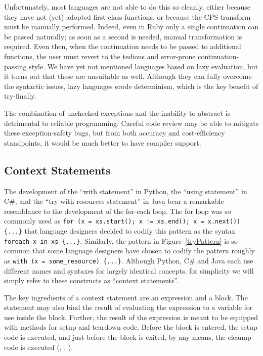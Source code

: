 \documentclass[11pt]{article}
\newcommand{\maybePage}{\newpage}
\begin{document}
Unfortunately, most languages are not able to do this so cleanly, either because they have not (yet) adopted first-class functions, or because the CPS transform must be manually performed.
Indeed, even in Ruby only a single continuation can be passed naturally; as soon as a second is needed, manual transformation is required.
Even then, when the continuation needs to be passed to additional functions, the user must revert to the tedious and error-prone continuation-passing style.
We have yet not mentioned languages based on lazy evaluation, but it turns out that these are unsuitable as well.
Although they can fully overcome the syntactic issues, lazy languages erode determinism, which is the key benefit of try-finally.

The combination of unchecked exceptions and the inability to abstract is detrimental to reliable programming.
Careful code review may be able to mitigate these exception-safety bugs, but from both accuracy and cost-efficiency standpoints, it would be much better to have compiler support.


\maybePage
\subsection{Context Statements}
\label{context statements}

The development of the ``with statement'' in Python, the ``using statement'' in C\#, and the ``try-with-resources statement'' in Java bear a remarkable resemblance to the development of the for-each loop.
The for loop was so commonly used as \texttt{for (x = xs.start(); x != xs.end(); x = x.next()) \{...\}} that language designers decided to codify this pattern as the syntax \texttt{foreach x in xs \{...\}}.
Similarly, the pattern in Figure~\ref{tryPattern} is so common that some language designers have chosen to codify the pattern roughly as \texttt{with (x = some\_resource) \{...\}}.
Although Python, C\# and Java each use different names and syntaxes for largely identical concepts, for simplicity we will simply refer to these constructs as ``context statements''.

The key ingredients of a context statement are an expression and a block.
The statement may also bind the result of evaluating the expression to a variable for use inside the block.
Further, the result of the expression is meant to be equipped with methods for setup and teardown code.
Before the block is entered, the setup code is executed, and just before the block is exited, by any means, the cleanup code is executed (\cite{JavaStandard}, \cite{PEP343}, \cite{cSharpStandard}).
\end{document}
